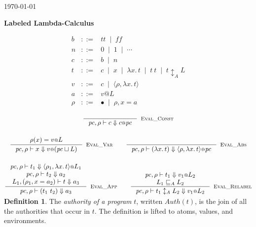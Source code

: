 \documentclass{article}
\makeatletter
\newcommand{\at}{\ensuremath{{\scriptstyle{@}}}}
\newcommand{\pc}{\ensuremath{{\mathit{pc}}}}
\theoremstyle{definition}
\newtheorem{definition}[theorem]{Definition}
\makeatother
\begin{document}
\begin{flushright}
  \today
\end{flushright}

\begin{flushleft}
  \textbf{Labeled Lambda-Calculus} 
\end{flushleft}

\[
\begin{array}{lcl}
  b & ::= &
  \mathit{tt}\;\; |\;\;
  \mathit{ff}
  \\
  n & ::= &
  0\;\; |\;\;
  1\;\; |\;\;
  \cdots
  \\
  c & ::= &
  b\;\; |\;\;
  n
  \\
  t & ::= &
  c\;\; |\;\;
  x\;\; |\;\;
  \lambda{x}.\, t\;\; |\;\;
  t\ t\;\; |\;\;
  t \updownarrow_{A} L
  \\
  v & ::= &
  c\;\; |\;\;
  \langle{\rho, \lambda{x}.\, t\rangle}
  \\
  a & ::= &
  v \at L
  \\
  \rho & ::= &
  \bullet\;\; |\;\;
  \rho, x = a
\end{array}
\]

\begin{gather*}
  \inference{}{
    \pc, \rho |- c \Downarrow c \at \pc
  }[\textsc{Eval\_Const}]
  \\[3ex]
  \inference{
    \rho(x) = v \at L
  }{
    \pc, \rho |- x \Downarrow v \at (\pc \sqcup L)
  }[\textsc{Eval\_Var}]
  \qquad
  \inference{}{
    \pc, \rho |- (\lambda{x}.\, t) \Downarrow
    \langle{\rho, \lambda{x}.\, t\rangle} \at \pc
  }[\textsc{Eval\_Abs}]
  \\[3ex]
  \inference{
    \pc, \rho |- t_1 \Downarrow \langle{\rho_1, \lambda{x}.\, t\rangle} \at L_1
    \\
    \pc, \rho |- t_2 \Downarrow a_2
    \\
    L_1, (\rho_1, x = a_2) |- t \Downarrow a_3
  }{
    \pc, \rho |- (t_1\ t_2) \Downarrow a_3
  }[\textsc{Eval\_App}]
  \qquad
  \inference{
    \pc, \rho |- t_1 \Downarrow v_1 \at L_2
    \\
    L_1 \sqsubseteq_{A} L_2
  }{
    \pc, \rho |- t_1 \updownarrow_{A} L_2 \Downarrow v_1 \at L_2
  }[\textsc{Eval\_Relabel}]
  \\[-2ex]
\end{gather*}

\begin{definition}
  The \emph{authority of a program} $t$, written $\mathit{Auth}(t)$, is the
  join of all the authorities that occur in $t$. The definition is lifted to
  atoms, values, and environments.
\end{definition}
\end{document}
